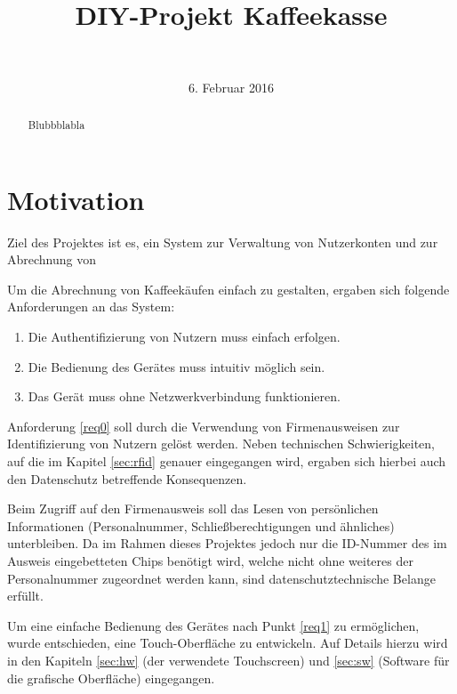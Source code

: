 \documentclass[11pt,a4paper]{IEEEtran}
\begin{document}
\title{DIY-Projekt Kaffeekasse} \author{\\
}

\date{6. Februar 2016}

\maketitle \begin{abstract} Blubbblabla \end{abstract}

\section{Motivation}

Ziel des Projektes ist es, ein System zur Verwaltung von Nutzerkonten und zur
Abrechnung von 

Um die Abrechnung von Kaffeekäufen einfach zu gestalten, ergaben sich folgende
Anforderungen an das System:

\begin{enumerate} 
    \item\label{req0} Die Authentifizierung von Nutzern muss
        einfach erfolgen.  
    \item\label{req1} Die Bedienung des Gerätes muss
        intuitiv möglich sein.  
    \item\label{req2} Das Gerät muss ohne
        Netzwerkverbindung funktionieren.  
\end{enumerate}

Anforderung \ref{req0} soll durch die Verwendung von Firmenausweisen zur
Identifizierung von Nutzern gelöst werden. Neben technischen Schwierigkeiten,
auf die im Kapitel \ref{sec:rfid} genauer eingegangen wird, ergaben sich
hierbei auch den Datenschutz betreffende Konsequenzen.

Beim Zugriff auf den Firmenausweis soll das Lesen von persönlichen
Informationen (Personalnummer, Schließberechtigungen und ähnliches)
unterbleiben. Da im Rahmen dieses Projektes jedoch nur die ID-Nummer des im
Ausweis eingebetteten Chips benötigt wird, welche nicht ohne weiteres der
Personalnummer zugeordnet werden kann, sind datenschutztechnische Belange
erfüllt.

Um eine einfache Bedienung des Gerätes nach Punkt \ref{req1} zu ermöglichen,
wurde entschieden, eine Touch-Oberfläche zu entwickeln. Auf Details hierzu wird
in den Kapiteln \ref{sec:hw} (der verwendete Touchscreen) und \ref{sec:sw}
(Software für die grafische Oberfläche) eingegangen.
\end{document}
